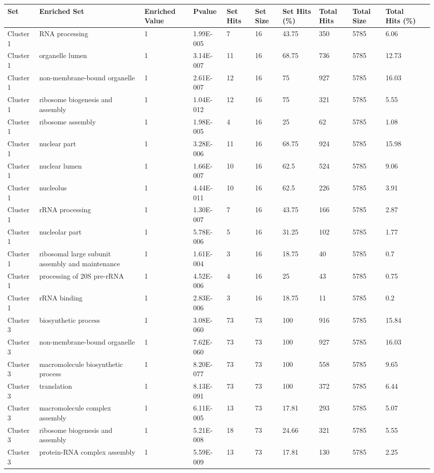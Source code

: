 \begin{tabular}{|l|l|l|l|l|l|l|l|l|l|l|}
\hline
Set&Enriched Set&Enriched Value&Pvalue&Set Hits&Set Size&Set Hits (\%)&Total Hits&Total Size&Total Hits (\%)&\\
\hline
Cluster 1&RNA processing&1&1.99E-005&7&16&43.75&350&5785&6.06&\\
\hline
Cluster 1&organelle lumen&1&3.14E-007&11&16&68.75&736&5785&12.73&\\
\hline
Cluster 1&non-membrane-bound organelle&1&2.61E-007&12&16&75&927&5785&16.03&\\
\hline
Cluster 1&ribosome biogenesis and assembly&1&1.04E-012&12&16&75&321&5785&5.55&\\
\hline
Cluster 1&ribosome assembly&1&1.98E-005&4&16&25&62&5785&1.08&\\
\hline
Cluster 1&nuclear part&1&3.28E-006&11&16&68.75&924&5785&15.98&\\
\hline
Cluster 1&nuclear lumen&1&1.66E-007&10&16&62.5&524&5785&9.06&\\
\hline
Cluster 1&nucleolus&1&4.44E-011&10&16&62.5&226&5785&3.91&\\
\hline
Cluster 1&rRNA processing&1&1.30E-007&7&16&43.75&166&5785&2.87&\\
\hline
Cluster 1&nucleolar part&1&5.78E-006&5&16&31.25&102&5785&1.77&\\
\hline
Cluster 1&ribosomal large subunit assembly and maintenance&1&1.61E-004&3&16&18.75&40&5785&0.7&\\
\hline
Cluster 1&processing of 20S pre-rRNA&1&4.52E-006&4&16&25&43&5785&0.75&\\
\hline
Cluster 1&rRNA binding&1&2.83E-006&3&16&18.75&11&5785&0.2&\\
\hline
Cluster 3&biosynthetic process&1&3.08E-060&73&73&100&916&5785&15.84&\\
\hline
Cluster 3&non-membrane-bound organelle&1&7.62E-060&73&73&100&927&5785&16.03&\\
\hline
Cluster 3&macromolecule biosynthetic process&1&8.20E-077&73&73&100&558&5785&9.65&\\
\hline
Cluster 3&translation&1&8.13E-091&73&73&100&372&5785&6.44&\\
\hline
Cluster 3&macromolecule complex assembly&1&6.11E-005&13&73&17.81&293&5785&5.07&\\
\hline
Cluster 3&ribosome biogenesis and assembly&1&5.21E-008&18&73&24.66&321&5785&5.55&\\
\hline
Cluster 3&protein-RNA complex assembly&1&5.59E-009&13&73&17.81&130&5785&2.25&\\

\end{tabular}
